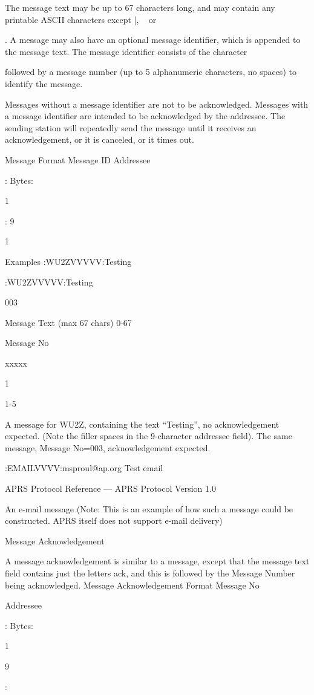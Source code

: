 The message text may be up to 67 characters long, and may contain any
printable ASCII characters except |, ~ or {.
A message may also have an optional message identifier, which is appended
to the message text. The message identifier consists of the character {
followed by a message number (up to 5 alphanumeric characters, no spaces)
to identify the message.

Messages without a message identifier are not to be acknowledged.
Messages with a message identifier are intended to be acknowledged by the
addressee. The sending station will repeatedly send the message until it
receives an acknowledgement, or it is canceled, or it times out.

Message Format
Message ID
Addressee

:
Bytes:

1

:
9

1

Examples
:WU2ZVVVVV:Testing

:WU2ZVVVVV:Testing{003

Message Text
(max 67 chars)
0-67

Message No

{

xxxxx

1

1-5

A message for WU2Z, containing the text “Testing”,
no acknowledgement expected.
(Note the filler spaces in the 9-character addressee field).
The same message, Message No=003, acknowledgement expected.

:EMAILVVVV:msproul@ap.org Test email

APRS Protocol Reference — APRS Protocol Version 1.0

An e-mail message (Note: This is an example
of how such a message could be constructed.
APRS itself does not support e-mail delivery)



Message
Acknowledgement

A message acknowledgement is similar to a message, except that the message
text field contains just the letters ack, and this is followed by the Message
Number being acknowledged.
Message Acknowledgement Format
Message
No

Addressee

:
Bytes:

1

9

:

}}}}
